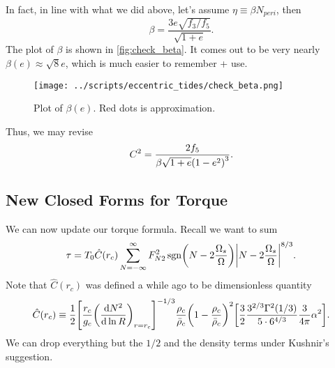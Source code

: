 \documentclass[11pt,
        usenames, %
        dvipsnames %
    ]{article}
\newcommand*{\rd}[2]{\frac{\mathrm{d}#1}{\mathrm{d}#2}}
\DeclareMathOperator{\sgn}{sgn}
\DeclarePairedDelimiter\abs{\lvert}{\rvert}
\DeclarePairedDelimiter\p{\lparen}{\rparen}
\DeclarePairedDelimiter\s{\lbrack}{\rbrack}
\begin{document}
In fact, in line with what we did above, let's assume $\eta \equiv \beta
N_{peri}$, then
\begin{equation}
    \beta = \frac{3e\sqrt{f_3/f_5}}{\sqrt{1 + e}}.
\end{equation}
The plot of $\beta$ is shown in \autoref{fig:check_beta}. It comes out to be
very nearly $\beta(e) \approx \sqrt{8}e$, which is much easier to remember +
use.
\begin{figure}[h]
    \centering
    \texttt{[image: ../scripts/eccentric\_tides/check\_beta.png]}
    \caption{Plot of $\beta(e)$. Red dots is approximation.
    }\label{fig:check_beta}
\end{figure}

Thus, we may revise
\begin{equation}
    C^2 = \frac{2f_5}{\beta \sqrt{1 + e}\p*{1 - e^2}^3}.
\end{equation}

\subsection{New Closed Forms for Torque}

We can now update our torque formula. Recall we want to sum
\begin{equation}
    \tau = T_0 \hat{C}(r_c)
            \sum\limits_{N = -\infty}^\infty
                F_{N2}^2 \sgn\p*{N - 2\frac{\Omega_s}{\Omega}}
                    \abs*{N - 2\frac{\Omega_s}{\Omega}}^{8/3}.
\end{equation}
Note that $\hat{C}(r_c)$ was defined a while ago to be dimensionless quantity
\begin{equation}
    \hat{C}(r_c) \equiv \frac{1}{2}
        \s*{\frac{r_c}{g_c}\p*{\rd{N^2}{\ln R}}_{r = r_c}}^{-1/3}
            \frac{\rho_c}{\bar{\rho}_c} \p*{1 - \frac{\rho_c}{\bar{\rho}_c}}^2
            \s*{\frac{3}{2}\frac{3^{2/3}\Gamma^2(1/3)}{5 \cdot
                6^{4/3}} \frac{3}{4\pi}\alpha^2}.
\end{equation}
We can drop everything but the $1/2$ and the density terms under Kushnir's
suggestion.
\end{document}
